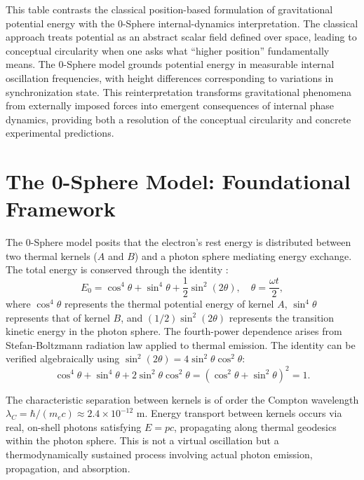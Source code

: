 \documentclass[%
 reprint,
 amsmath,amssymb,
 aps,
 prb,
]{revtex4-2}
\numberwithin{equation}{section}
\begin{document}
\begin{table}[t!]
\begin{minipage}{0.95\textwidth}
\justifying\small
This table contrasts the classical position-based formulation of gravitational potential energy with the 0-Sphere internal-dynamics interpretation. The classical approach treats potential as an abstract scalar field defined over space, leading to conceptual circularity when one asks what ``higher position'' fundamentally means. The 0-Sphere model grounds potential energy in measurable internal oscillation frequencies, with height differences corresponding to variations in synchronization state. This reinterpretation transforms gravitational phenomena from externally imposed forces into emergent consequences of internal phase dynamics, providing both a resolution of the conceptual circularity and concrete experimental predictions.
\end{minipage}
\end{table}


\section{The 0-Sphere Model: Foundational Framework}
\label{sec:0sphere_foundation}

The 0-Sphere model posits that the electron's rest energy is distributed between two thermal kernels ($A$ and $B$) and a photon sphere mediating energy exchange. The total energy is conserved through the identity \cite{Hanamura2024Spin,Hanamura2026Geometrical}:
\begin{equation}
E_0 = \cos^4\theta + \sin^4\theta + \frac{1}{2}\sin^2(2\theta), \quad \theta = \frac{\omega t}{2},
\label{eq:energy_identity}
\end{equation}
where $\cos^4\theta$ represents the thermal potential energy of kernel $A$, $\sin^4\theta$ represents that of kernel $B$, and $(1/2)\sin^2(2\theta)$ represents the transition kinetic energy in the photon sphere. The fourth-power dependence arises from Stefan-Boltzmann radiation law applied to thermal emission. The identity can be verified algebraically using $\sin^2(2\theta) = 4\sin^2\theta\cos^2\theta$:
\[
\cos^4\theta + \sin^4\theta + 2\sin^2\theta\cos^2\theta = (\cos^2\theta + \sin^2\theta)^2 = 1.
\]

The characteristic separation between kernels is of order the Compton wavelength $\lambda_C = \hbar/(m_e c) \approx 2.4 \times 10^{-12}$ m. Energy transport between kernels occurs via real, on-shell photons satisfying $E = pc$, propagating along thermal geodesics within the photon sphere. This is not a virtual oscillation but a thermodynamically sustained process involving actual photon emission, propagation, and absorption.
\end{document}
